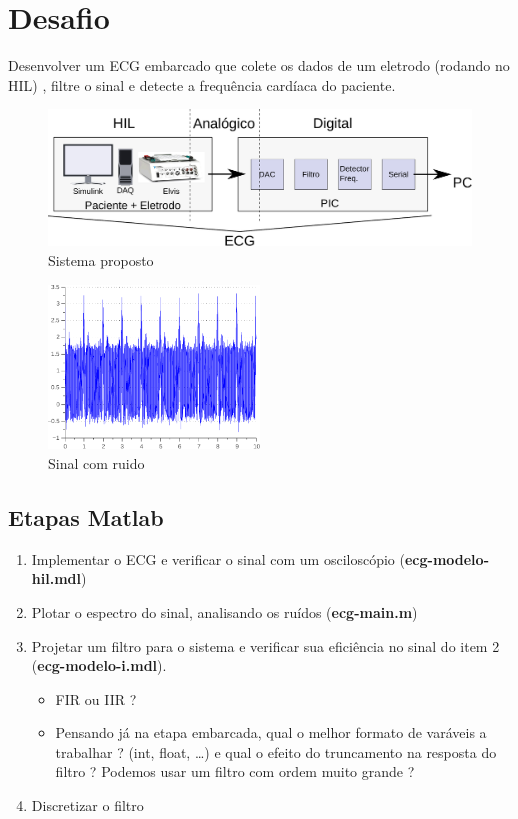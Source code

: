 \documentclass[11pt,a4paper]{scrartcl}
\begin{document}
\section{Desafio}

Desenvolver um ECG embarcado que colete os dados de um eletrodo (rodando no HIL) , filtre o sinal e detecte a frequência cardíaca do paciente.

\begin{figure}[!ht]
\centering
\includegraphics[width=1\textwidth]{figs/esquema.pdf}
\caption{Sistema proposto}
\label{fig:esquema}
\end{figure}

\begin{figure}[!ht]
\centering
\includegraphics[width=0.5\textwidth]{figs/ECG.pdf}
\caption{Sinal com ruido}
\label{fig:ruido}
\end{figure}

\subsection{Etapas Matlab} \label{etapa:matlab}

\begin{enumerate}
	\item Implementar o ECG e verificar o sinal com um osciloscópio (\textbf{ecg-modelo-hil.mdl})
	\item Plotar o espectro do sinal, analisando os ruídos  (\textbf{ecg-main.m})
	\item Projetar um filtro para o sistema e verificar sua eficiência no sinal do item 2 (\textbf{ecg-modelo-i.mdl}). 
		\begin{itemize}
			\item FIR ou IIR ?
			\item Pensando já na etapa embarcada, qual o melhor formato de varáveis a trabalhar ? (int, float, \ldots) e qual o efeito do truncamento na resposta do filtro ? Podemos usar um filtro com ordem muito grande ?
		\end{itemize}
	\item Discretizar o filtro \label{filtro:discreto}
\end{enumerate}
\end{document}
